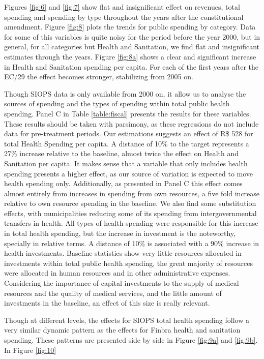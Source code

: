Figures \ref{fig:6} and \ref{fig:7} show flat and insignificant effect on revenues, total spending and spending by type throughout the years after the constitutional amendment. Figure \ref{fig:8} plots the trends for public spending by category. Data for some of this variables is quite noisy for the period before the year 2000, but in general, for all categories but Health and Sanitation, we find flat and insignificant estimates through the years. Figure \ref{fig:8a} shows a clear and significant increase in Health and Sanitation spending per capita. For each of the first years after the EC/29 the effect becomes stronger, stabilizing from 2005 on.




Though SIOPS data is only available from 2000 on, it allow us to analyse the sources of spending and the types of spending within total public health spending. Panel C in Table \ref{table:fiscal} presents the results for these variables. These results should be taken with parsimony, as these regressions do not include data for pre-treatment periods. Our estimations suggests an effect of R\$ 528 for total Health Spending per capita. A distance of 10\% to the target represents a 27\% increase relative to the baseline, almost twice the effect on Health and Sanitation per capita. It makes sense that a variable that only includes health spending presents a higher effect, as our source of variation is expected to move health spending only. Additionally, as presented in Panel C this effect comes almost entirely from increases in spending from own resources, a five fold increase relative to own resource spending in the baseline. We also find some substitution effects, with municipalities reducing some of its spending from intergovernmental transfers in health. All types of health spending were responsible for this increase in total health spending, but the increase in investment is the noteworthy, specially in relative terms. A distance of 10\% is associated with a 90\% increase in health investments. Baseline statistics show very little resources allocated in investments within total public health spending, the great majority of resources were allocated in human resources and in other administrative expenses. Considering the importance of capital investments to the supply of medical resources and the quality of medical services, and the little amount of investments in the baseline, an effect of this size is really relevant.

Though at different levels, the effects for SIOPS total health spending follow a very similar dynamic pattern as the effects for Finbra health and sanitation spending. These patterns are presented side by side in Figure \ref{fig:9a} and \ref{fig:9b}. In Figure \ref{fig:10} 

